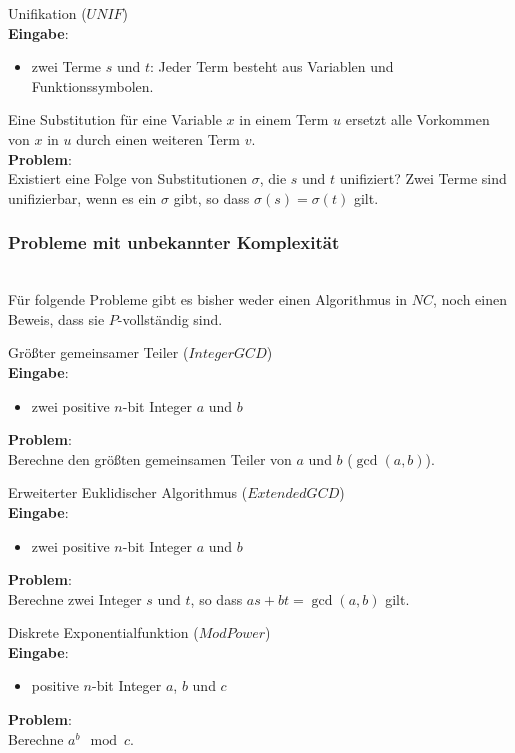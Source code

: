 \begin{problem}
    Unifikation ($UNIF$) \\
    \textbf{Eingabe}:
    \begin{itemize}
        \item zwei Terme $s$ und $t$: Jeder Term besteht aus Variablen und
            Funktionssymbolen.
    \end{itemize}
    Eine Substitution für eine Variable $x$ in einem Term $u$ ersetzt alle
    Vorkommen von $x$ in $u$ durch einen weiteren Term $v$. \\
    \textbf{Problem}: \\
    Existiert eine Folge von Substitutionen $\sigma$, die $s$ und $t$
    unifiziert?
    Zwei Terme sind unifizierbar, wenn es ein $\sigma$ gibt, so dass
    $\sigma(s) = \sigma(t)$ gilt.
    \cite[S.171]{greenlaw}
\end{problem}

\subsubsection{Probleme mit unbekannter Komplexität} \hfill \\
Für folgende Probleme gibt es bisher weder einen Algorithmus in $NC$,
noch einen Beweis, dass sie $P$-vollständig sind.

\begin{problem}
    Größter gemeinsamer Teiler ($IntegerGCD$) \\
    \textbf{Eingabe}:
    \begin{itemize}
        \item zwei positive $n$-bit Integer $a$ und $b$
    \end{itemize}
    \textbf{Problem}: \\
    Berechne den größten gemeinsamen Teiler von $a$ und $b$ ($\gcd(a,b)$).
    \cite[S.229]{greenlaw}
\end{problem}

\begin{problem}
    Erweiterter Euklidischer Algorithmus ($ExtendedGCD$) \\
    \textbf{Eingabe}:
    \begin{itemize}
        \item zwei positive $n$-bit Integer $a$ und $b$
    \end{itemize}
    \textbf{Problem}: \\
    Berechne zwei Integer $s$ und $t$, so dass $as + bt = \gcd(a,b)$ gilt.
    \cite[S.229]{greenlaw}
\end{problem}

\begin{problem}
    Diskrete Exponentialfunktion ($ModPower$) \\
    \textbf{Eingabe}:
    \begin{itemize}
        \item positive $n$-bit Integer $a$, $b$ und $c$
    \end{itemize}
    \textbf{Problem}: \\
    Berechne $a^b \mod c$.
    \cite[S.231]{greenlaw}
\end{problem}
